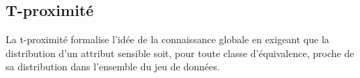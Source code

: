 \subsection{T-proximité}
La t-proximité formalise l’idée de la connaissance globale en exigeant que la distribution d’un attribut sensible soit, pour toute classe d'équivalence, proche de sa distribution dans l’ensemble du jeu de données. 